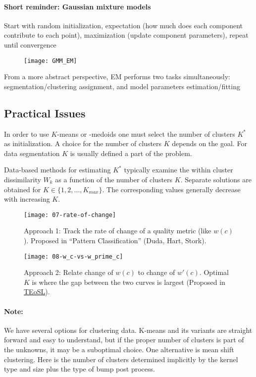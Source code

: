 \paragraph{Short reminder: Gaussian mixture models}

Start with random initialization, expectation (how much does each component contribute to each point), maximization (update component parameters), repeat until convergence

\begin{figure}[H]
  \centering
  \texttt{[image: GMM\_EM]}
\end{figure}

From a more abstract perspective, EM performs two tasks simultaneously: segmentation/clustering assignment, and model parameters estimation/fitting

 \subsection*{Practical Issues}
 In order to use \(K\)-means or -medoids one must select the number of clusters \(K^*\) as initialization. A choice for the number of clusters \(K\) depends on the goal. For data segmentation \(K\) is usually defined a part of the problem.

 Data-based methods for estimating \(K^*\) typically examine the within cluster dissimilarity \(W_k\) as a function of the number of clusters \(K\). Separate solutions are obtained for \(K \in \{1,2,\dots,K_{max}\}\). The corresponding values generally decrease with increasing \(K\).

\begin{figure}[H]
 	\centering
 	\begin{minipage}[b]{0.49\textwidth}
   	\texttt{[image: 07-rate-of-change]}
   \caption{Approach 1: Track the rate of change of a quality metric (like $w(c)$). Proposed in ``Pattern Classification'' (Duda, Hart, Stork).}
 	\end{minipage}
 	\begin{minipage}[b]{0.49\textwidth}
   	\texttt{[image: 08-w\_c-vs-w\_prime\_c]}
   \caption{Approach 2: Relate change of $w(c)$ to change of $w'(c)$. Optimal \(K\) is where the gap between the two curves is largest (Proposed in \href{https://web.stanford.edu/~hastie/ElemStatLearn/}{TEoSL}).}
 	\end{minipage}
\end{figure}

\paragraph{Note:}
We have several options for clustering data. K-means and its variants are straight forward and easy to understand, but if the proper number of clusters is part of the unknowns, it may be a suboptimal choice.
One alternative is mean shift clustering. Here is the number of clusters determined implicitly by the kernel type and size plus the type of bump post process.
